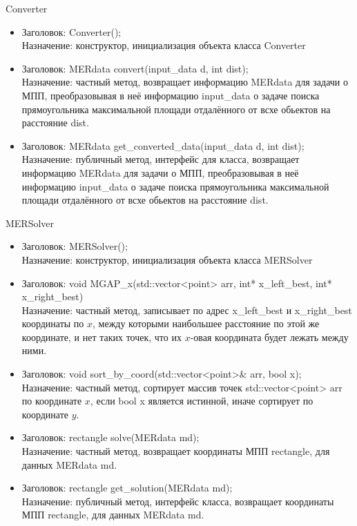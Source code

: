 \documentclass[12pt,a4paper]{article}
\begin{document}
{\begin{center}
Converter
\end{center}
\begin{itemize}
\item Заголовок: Converter(); \\
Назначение: конструктор, инициализация объекта класса Converter\\
\item Заголовок: MERdata convert(input\_data d, int dist);\\
Назначение: частный метод, возвращает информацию MERdata для задачи о МПП, преобразовывая в неё информацию input\_data о задаче поиска прямоугольника максимальной площади отдалённого от всхе обьектов на расстояние dist.\\
\item Заголовок: MERdata get\_converted\_data(input\_data d, int dist); \\
Назначение: публичный метод, интерфейс для класса, возвращает информацию MERdata для задачи о МПП, преобразовывая в неё информацию input\_data о задаче поиска прямоугольника максимальной площади отдалённого от всхе обьектов на расстояние dist.
\end{itemize}

\begin{center}
MERSolver
\end{center}
\begin{itemize}
\item Заголовок: MERSolver(); \\
Назначение: конструктор, инициализация объекта класса MERSolver\\
\item Заголовок: void MGAP\_x(std::vector<point> arr, int* x\_left\_best, int* x\_right\_best)\\
Назначение: частный метод, записывает по адрес x\_left\_best и x\_right\_best координаты по $x$, между которыми наибольшее расстояние по этой же координате, и нет таких точек, что их $x$-овая координата будет лежать между ними.\\
\item Заголовок: void sort\_by\_coord(std::vector<point>\& arr, bool x); \\
Назначение: частный метод, сортирует массив точек std::vector<point> arr по координате $x$, если bool x является истинной, иначе сортирует по координате $y$.
\item Заголовок: rectangle solve(MERdata md);\\
Назначение: частный метод, возвращает координаты МПП rectangle, для данных MERdata md.
\item Заголовок: rectangle get\_solution(MERdata md);\\
Назначение: публичный метод, интерфейс класса, возвращает координаты МПП rectangle, для данных MERdata md.
\end{itemize}

}
\end{document}
